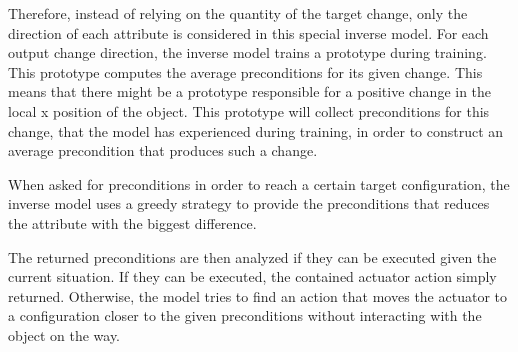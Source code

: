 Therefore, instead of relying on the quantity of the target change, only the direction of each attribute is considered in this special inverse model. For each output change direction, the inverse model trains a prototype during training. This prototype computes the average preconditions for its given change. 
This means that there might be a prototype responsible for a positive change in the local x position of the object.
This prototype will collect preconditions for this change, that the model has experienced during training, in order to construct an average precondition that produces such a change.

When asked for preconditions in order to reach a certain target configuration, the inverse model uses a greedy strategy to provide the preconditions that reduces the attribute with the
biggest difference. 

The returned preconditions are then analyzed if they can be executed given the current situation. If they can be executed, the contained actuator action simply returned. 
Otherwise, the model tries to find an action that moves the actuator to a configuration closer to the given preconditions without interacting with the object on the way.



